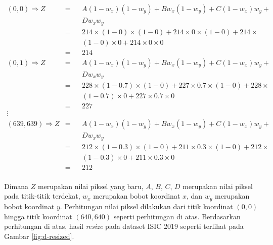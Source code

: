     \begin{align*}
        (0,0) \Rightarrow Z     &=  &&A (1-w_x) (1-w_y) + B w_x (1-w_y) + C (1-w_x) w_y + \\
                                &   &&D w_x w_y\\
                                &=  &&214\times (1-0)\times (1-0) + 214\times 0\times (1-0) + 214 \times \\
                                &   &&(1-0)\times 0 + 214\times 0\times 0\\
                                &=  &&214\\
        (0,1) \Rightarrow Z     &=  &&A (1-w_x) (1-w_y) + B w_x (1-w_y) + C (1-w_x) w_y + \\
                                &   &&D w_x w_y\\
                                &=  &&228\times (1-0.7)\times (1-0) + 227\times 0.7\times (1-0) + 228 \times \\
                                &   &&(1-0.7)\times 0 + 227\times 0.7\times 0\\
                                &=  &&227\\
        \vdots\\
        (639,639) \Rightarrow Z &=  &&A (1-w_x) (1-w_y) + B w_x (1-w_y) + C (1-w_x) w_y + \\
                                &   &&D w_x w_y\\
                                &=  &&212\times (1-0.3)\times (1-0) + 211\times 0.3\times (1-0) + 212 \times \\
                                &   &&(1-0.3)\times 0 + 211\times 0.3\times 0\\
                                &=  &&212\\
    \end{align*}
    
    Dimana $Z$ merupakan nilai piksel yang baru, $A$, $B$, $C$, $D$ merupakan nilai piksel pada titik-titik terdekat, $w_x$ merupakan bobot koordinat $x$, dan $w_y$ merupakan bobot koordinat $y$. Perhitungan nilai piksel dilakukan dari titik koordinat $(0, 0)$ hingga titik koordinat $(640, 640)$ seperti perhitungan di atas. Berdasarkan perhitungan di atas, hasil \textit{resize} pada dataset ISIC 2019 seperti terlihat pada Gambar \ref{fig:d-resized}.

